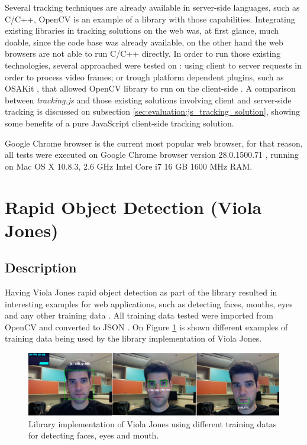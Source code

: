 Several tracking techniques are already available in server-side languages, such as C/C++, OpenCV \cite{Bradski2000} is an example of a library with those capabilities. Integrating existing libraries in tracking solutions on the web was, at first glance, much doable, since the code base was already available, on the other hand the web browsers are not able to run C/C++ directly. In order to run those existing technologies, several approached were tested on \cite{Pablo2013}: using client to server requests in order to process video frames; or trough platform dependent plugins, such as OSAKit \cite{OSAKit2013}, that allowed OpenCV library to run on the client-side \cite{Pablo2013}. A comparison between \textit{tracking.js} and those existing solutions involving client and server-side tracking is discussed on subsection \ref{sec:evaluation:js_tracking_solution}, showing some benefits of a pure JavaScript client-side tracking solution.

Google Chrome browser is the current most popular web browser, for that reason, all tests were executed on Google Chrome browser version 28.0.1500.71 \cite{Chrome2010}, running on Mac OS X 10.8.3, 2.6 GHz Intel Core i7 16 GB 1600 MHz RAM.


\section{Rapid Object Detection (Viola Jones)} %
\label{sec:evaluation:results:rapid_object_detection}

\subsection{Description} %
\label{sub:evaluation:rapid_object_detection:description}

Having Viola Jones rapid object detection as part of the library resulted in interesting examples for web applications, such as detecting faces, mouths, eyes and any other training data \cite{Viola2001}. All training data tested were imported from OpenCV \cite{Bradski2000} and converted to JSON \cite{Crockford2013}. On Figure \ref{figure:viola_overview} is shown different examples of training data being used by the library implementation of Viola Jones.

\begin{figure}[!htb]
  \centering
  \includegraphics[width=\linewidth]{chapters/evaluation/viola_overview.png}
  \caption{Library implementation of Viola Jones using different training datas for detecting faces, eyes and mouth.}
  \label{figure:viola_overview}
\end{figure}

